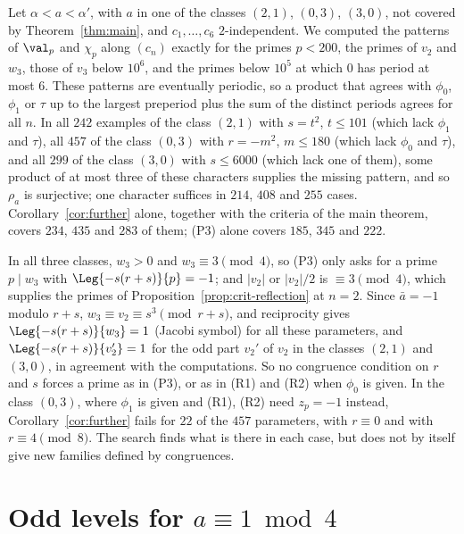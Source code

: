 \begin{remark}
  \label{rem:further-data}
  Let $\alpha < a < \alpha'$, with $a$ in one of the classes $(2,1)$, $(0,3)$, $(3,0)$, not covered by
  Theorem~\ref{thm:main}, and $c_1, \dots, c_6$ $2$-independent. We computed the patterns of
  $\val_p$ and $\chi_p$ along $(c_n)$ exactly for the primes $p < 200$, the primes of $v_2$ and
  $w_3$, those of $v_3$ below $10^6$, and the primes below $10^5$ at which $0$ has period at most
  $6$. These patterns are eventually periodic, so a product that agrees with $\phi_0$, $\phi_1$ or
  $\tau$ up to the largest preperiod plus the sum of the distinct periods agrees for all $n$. In
  all $242$ examples of the class $(2,1)$ with $s = t^2$, $t \le 101$ (which lack $\phi_1$ and
  $\tau$), all $457$ of the class $(0,3)$ with $r = -m^2$, $m \le 180$ (which lack $\phi_0$ and
  $\tau$), and all $299$ of the class $(3,0)$ with $s \le 6000$ (which lack one of them), some
  product of at most three of these characters supplies the missing pattern, and so $\rho_a$ is
  surjective; one character suffices in $214$, $408$ and $255$ cases. Corollary~\ref{cor:further}
  alone, together with the criteria of the main theorem, covers $234$, $435$ and $283$ of them;
  (P3) alone covers $185$, $345$ and $222$.

  In all three classes, $w_3 > 0$ and $w_3 \equiv 3 \pmod 4$, so (P3) only asks for a prime
  $p \mid w_3$ with $\Leg{-s(r+s)}{p} = -1$; and $|v_2|$ or $|v_2|/2$ is $\equiv 3 \pmod 4$, which
  supplies the primes of Proposition~\ref{prop:crit-reflection} at $n = 2$. Since
  $\bar a = -1$ modulo $r + s$, $w_3 \equiv v_2 \equiv s^3 \pmod{r + s}$, and reciprocity gives
  $\Leg{-s(r+s)}{w_3} = 1$ (Jacobi symbol) for all these parameters, and
  $\Leg{-s(r+s)}{v_2'} = 1$ for the odd part $v_2'$ of $v_2$ in the classes $(2,1)$ and $(3,0)$,
  in agreement with the computations. So no congruence condition on $r$ and $s$ forces a prime as
  in (P3), or as in (R1) and (R2) when $\phi_0$ is given. In the class $(0,3)$, where $\phi_1$ is
  given and (R1), (R2) need $z_p = -1$ instead, Corollary~\ref{cor:further} fails for $22$ of the
  $457$ parameters, with $r \equiv 0$ and with $r \equiv 4 \pmod 8$. The search finds what is
  there in each case, but does not by itself give new families defined by congruences.
\end{remark}

\section{Odd levels for \texorpdfstring{$a \equiv 1 \bmod 4$}{a = 1 mod 4}}

